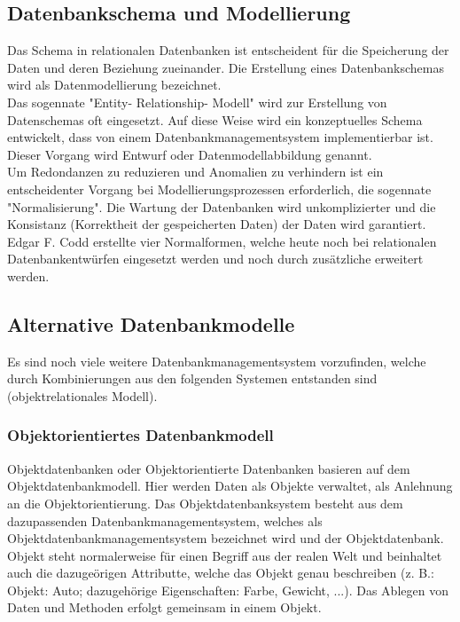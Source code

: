 \documentclass[12pt,a4paper]{report}
\begin{document}
\begin{onehalfspace}
\subsection{Datenbankschema und Modellierung}
Das Schema in relationalen Datenbanken ist entscheident für die Speicherung der Daten und deren Beziehung zueinander. Die Erstellung eines Datenbankschemas wird als Datenmodellierung bezeichnet.\\

Das sogennate "{}Entity- Relationship- Modell"{} wird zur Erstellung von Datenschemas oft eingesetzt. Auf diese Weise wird ein konzeptuelles Schema entwickelt, dass von einem Datenbankmanagementsystem implementierbar ist. Dieser Vorgang wird Entwurf oder Datenmodellabbildung genannt.\\

Um Redondanzen zu reduzieren und Anomalien zu verhindern ist ein entscheidenter Vorgang bei Modellierungsprozessen erforderlich, die sogennate "{}Normalisierung"{}. Die Wartung der Datenbanken wird unkomplizierter und die Konsistanz (Korrektheit der gespeicherten Daten) der Daten wird garantiert.\\

Edgar F. Codd erstellte vier Normalformen, welche heute noch bei relationalen Datenbankentwürfen eingesetzt werden und noch durch zusätzliche erweitert werden. 

\subsection{Alternative Datenbankmodelle}
Es sind noch viele weitere Datenbankmanagementsystem vorzufinden, welche durch Kombinierungen aus den folgenden Systemen entstanden sind (objektrelationales Modell). 
\subsubsection{Objektorientiertes Datenbankmodell}
Objektdatenbanken oder Objektorientierte Datenbanken basieren auf dem Objektdatenbankmodell. Hier werden Daten als Objekte verwaltet, als Anlehnung an die Objektorientierung. Das Objektdatenbanksystem besteht aus dem dazupassenden Datenbankmanagementsystem, welches als Objektdatenbankmanagementsystem bezeichnet wird und der Objektdatenbank.\\

Objekt steht normalerweise für einen Begriff aus der realen Welt und beinhaltet auch die dazugeörigen Attributte, welche das Objekt genau beschreiben (z. B.: Objekt: Auto; dazugehörige Eigenschaften: Farbe, Gewicht, ...). Das Ablegen von Daten und Methoden erfolgt gemeinsam in einem Objekt.\\


\end{onehalfspace}
\end{document}
